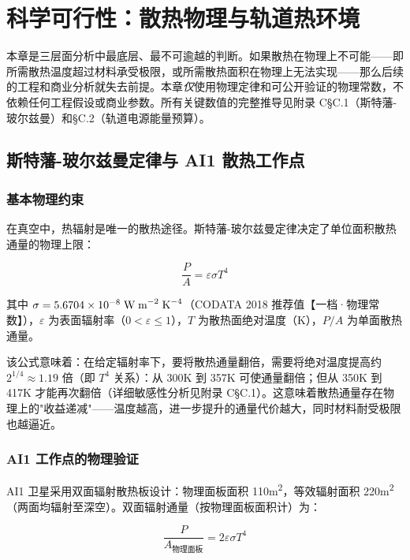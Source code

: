 
\section{科学可行性：散热物理与轨道热环境}

本章是三层面分析中最底层、最不可逾越的判断。如果散热在物理上不可能——即所需散热温度超过材料承受极限，或所需散热面积在物理上无法实现——那么后续的工程和商业分析就失去前提。本章\emph{仅}使用物理定律和可公开验证的物理常数，不依赖任何工程假设或商业参数。所有关键数值的完整推导见附录 C\;\S C.1（斯特藩-玻尔兹曼）和\;\S C.2（轨道电源能量预算）。

\subsection{斯特藩-玻尔兹曼定律与 AI1 散热工作点}

\subsubsection{基本物理约束}

在真空中，热辐射是唯一的散热途径。斯特藩-玻尔兹曼定律决定了单位面积散热通量的物理上限：

\begin{equation}
\frac{P}{A} = \varepsilon \sigma T^{4}
\label{eq:sb}
\end{equation}

其中 $\sigma = 5.6704\times10^{-8}\;\text{W\;m}^{-2}\;\text{K}^{-4}$（CODATA 2018 推荐值【一档·物理常数】），$\varepsilon$ 为表面辐射率（$0<\varepsilon\leq 1$），$T$ 为散热面绝对温度（K），$P/A$ 为单面散热通量。

该公式意味着：在给定辐射率下，要将散热通量翻倍，需要将绝对温度提高约 $2^{1/4} \approx 1.19$ 倍（即 $T^4$ 关系）：从 300\;K 到 357\;K 可使通量翻倍；但从 350\;K 到 417\;K 才能再次翻倍（详细敏感性分析见附录 C\;\S C.1）。这意味着散热通量存在物理上的"收益递减"——温度越高，进一步提升的通量代价越大，同时材料耐受极限也越逼近。

\subsubsection{AI1 工作点的物理验证}

AI1 卫星采用双面辐射散热板设计：物理面板面积 110\;m\textsuperscript{2}，等效辐射面积 220\;m\textsuperscript{2}（两面均辐射至深空）。双面辐射通量（按物理面板面积计）为：

\begin{equation}
\frac{P}{A_{\text{物理面板}}} = 2\varepsilon\sigma T^{4}
\label{eq:sb_double}
\end{equation}

